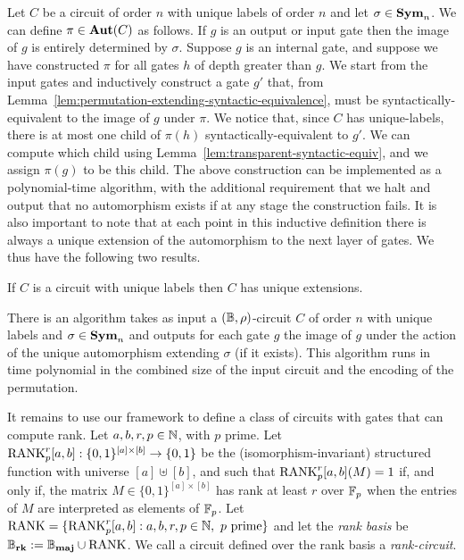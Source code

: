 \documentclass[a4paper,UKenglish]{lipics-v2018}
\begin{document}
Let $C$ be a circuit of order $n$ with unique labels of order $n$ and let $\sigma \in
\text{\textbf{Sym}}_n$. We can define $\pi \in \text{\textbf{Aut}}(C)$ as follows. If $g$ is an output or
input gate then the image of $g$ is entirely determined by $\sigma$. Suppose $g$
is an internal gate, and suppose we have constructed $\pi$ for all gates $h$ of
depth greater than $g$. We start from the input gates and inductively construct
a gate $g'$ that, from
Lemma~\ref{lem:permutation-extending-syntactic-equivalence}, must be
syntactically-equivalent to the image of $g$ under $\pi$. We notice that, since
$C$ has unique-labels, there is at most one child of $ \pi(h)$
syntactically-equivalent to $g'$. We can compute which child using
Lemma~\ref{lem:transparent-syntactic-equiv}, and we assign $\pi(g)$ to be this
child. The above construction can be implemented as a polynomial-time algorithm,
with the additional requirement that we halt and output that no automorphism
exists if at any stage the construction fails. It is also important to note that
at each point in this inductive definition there is always a unique extension of
the automorphism to the next layer of gates. We thus have the following two
results.

\begin{lemma}
  If $C$ is a circuit with unique labels then $C$ has unique extensions.
  \label{lem:unique-labels-unique-extensions}
\end{lemma}

\begin{lemma}
  There is an algorithm takes as input a $(\mathbb{B}, \rho)$-circuit $C$ of order $n$
  with unique labels and $\sigma \in \text{\textbf{Sym}}_n$ and outputs for each gate $g$ the
  image of $g$ under the action of the unique automorphism extending $\sigma$
  (if it exists). This algorithm runs in time polynomial in the combined size of
  the input circuit and the encoding of the permutation.
  \label{lem:compute-automorphisms}
\end{lemma}

It remains to use our framework to define a class of circuits with gates that
can compute rank. Let $a, b, r, p \in \mathbb{N}$, with $p$ prime. Let
$\text{\upshape RANK}^r_p[a,b] : \{0,1\}^{[a] \times [b]} \rightarrow \{0,1\}$ be the
(isomorphism-invariant) structured function with universe $[a] \uplus [b]$, and
such that $\text{\upshape RANK}^r_p[a,b](M) = 1$ if, and only if, the matrix $M \in
\{0,1\}^{[a] \times [b]}$ has rank at least $r$ over $\mathbb{F}_p$ when the entries of
$M$ are interpreted as elements of $\mathbb{F}_p$. Let $\text{\upshape RANK} = \{\text{\upshape RANK}^{r}_p[a,b] : a,
b, r, p \in \mathbb{N}, \text{ $p$ prime}\}$ and let the \emph{rank basis} be $\mathbb{B}_{\text{\textbf{rk}}} :=
\mathbb{B}_{\text{\textbf{maj}}} \cup \text{\upshape RANK}$. We call a circuit defined over the rank basis a
\emph{rank-circuit}.
\end{document}
